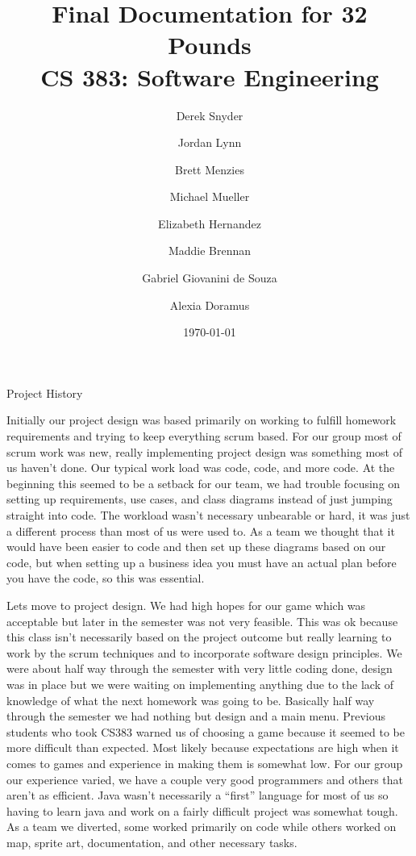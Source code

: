 \documentclass[12pt]{report}
\author{
  Derek Snyder\\
  \and
  Jordan Lynn\\
  \and
  Brett Menzies\\
  \and
  Michael Mueller\\
  \and
  Elizabeth Hernandez\\
  \and
  Maddie Brennan\\
  \and
  Gabriel Giovanini de Souza\\
  \and
  Alexia Doramus\\
}
\begin{document}
\title{Final Documentation for 32 Pounds\\ \vspace{2 mm} {\large CS 383: Software Engineering}}

\date{\today}
\maketitle
\clearpage
\tableofcontents

\begin{chapter}{Project History}
	
	Initially our project design was based primarily on working to fulfill homework requirements and trying to keep everything scrum based.  
	For our group most of scrum work was new, really implementing project design was something most of us haven't done.  
	Our typical work load was code, code, and more code.  At the beginning this seemed to be a setback for our team, we had trouble focusing on setting up requirements, use cases, and class diagrams instead of just jumping straight into code.  
	The workload wasn't necessary unbearable or hard, it was just a different process than most of us were used to.  
	As a team we thought that it would have been easier to code and then set up these diagrams based on our code, but when setting up a business idea you must have an actual plan before you have the code, so this was essential.  
	
	Lets move to project design.
	We had high hopes for our game which was acceptable but later in the semester was not very feasible.  
	This was ok because this class isn't necessarily based on the project outcome but really learning to work by the scrum techniques and to incorporate software design principles. 
	We were about half way through the semester with very little coding done, design was in place but we were waiting on implementing anything due to the lack of knowledge of what the next homework was going to be. 
	Basically half way through the semester we had nothing but design and a main menu. 
	Previous students who took CS383 warned us of choosing a game because it seemed to be more difficult than expected.  
	Most likely because expectations are high when it comes to games and experience in making them is somewhat low.  
	For our group our experience varied, we have a couple very good programmers and others that aren't as efficient.  
	Java wasn't necessarily a “first” language for most of us so having to learn java and work on a fairly difficult project was somewhat tough.  
	As a team we diverted, some worked primarily on code while others worked on map, sprite art, documentation, and other necessary tasks.  
	

\end{chapter}
\end{document}
